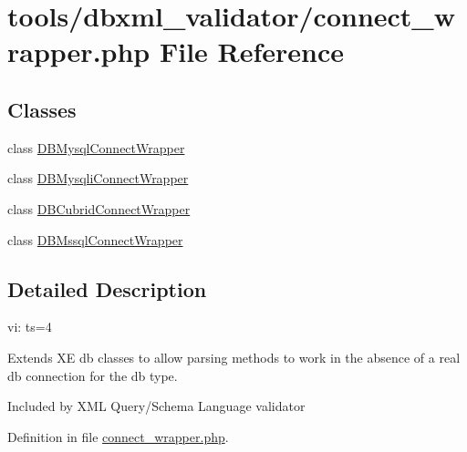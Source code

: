 \hypertarget{connect__wrapper_8php}{\section{tools/dbxml\+\_\+validator/connect\+\_\+wrapper.php File Reference}
\label{connect__wrapper_8php}
}
\subsection*{Classes}
\begin{DoxyCompactItemize}
\item 
class \hyperlink{classDBMysqlConnectWrapper}{D\+B\+Mysql\+Connect\+Wrapper}
\item 
class \hyperlink{classDBMysqliConnectWrapper}{D\+B\+Mysqli\+Connect\+Wrapper}
\item 
class \hyperlink{classDBCubridConnectWrapper}{D\+B\+Cubrid\+Connect\+Wrapper}
\item 
class \hyperlink{classDBMssqlConnectWrapper}{D\+B\+Mssql\+Connect\+Wrapper}
\end{DoxyCompactItemize}


\subsection{Detailed Description}
vi\+: ts=4

Extends X\+E db classes to allow parsing methods to work in the absence of a real db connection for the db type.

Included by X\+M\+L Query/\+Schema Language validator 

Definition in file \hyperlink{connect__wrapper_8php_source}{connect\+\_\+wrapper.\+php}.


